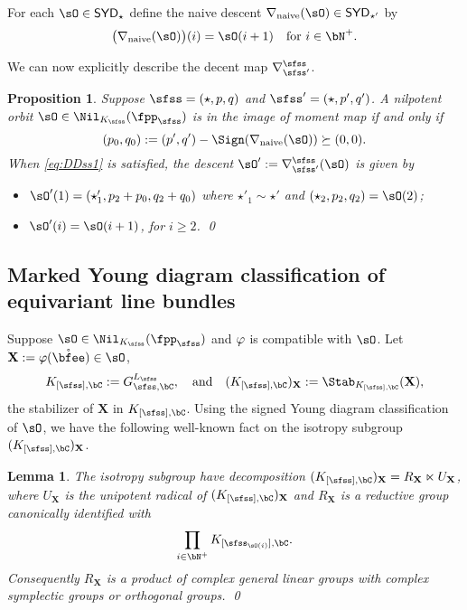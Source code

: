 \documentclass[12pt,a4paper]{amsart}
\def\SYD{{\mathsf{SYD}}}
\def\Im{\operatorname{Im}}
\newcommand{\X}{\mathbf{X}}
\def\DD{\nabla}
\numberwithin{equation}{section}
\newtheorem{lem}[thm]{Lemma}
\newtheorem{prop}[thm]{Proposition}
\theoremstyle{remark}
\def\DDn{\DD_{\mathrm{naive}}}
\begin{document}
For each $\sO\in \SYD_\star$ define the naive descent $\DDn(\sO)\in
\SYD_{\star'}$ by
\[\big(\DDn(\sO)\big)(i) = \sO(i+1) \quad \text{for } i \in \bN^+.\]

We can now explicitly describe the decent map $\DDss$.
\begin{prop}\label{prop:DDss}
Suppose $\sfss=(\star,p,q)$ and
$\sfss'=(\star,p',q')$. A nilpotent orbit $\sO\in \Nil_{\Ks}(\fpps)$ is in the
image of moment map if and only if
\begin{equation}\label{eq:DDss1}
  (p_0,q_0):= (p',q') - \Sign(\DDn(\sO)) \succeq (0,0).
\end{equation}
When \eqref{eq:DDss1} is satisfied, the descent $\sO' := \DDss(\sO)$
is given by
\begin{itemize}
\item $\sO'(1) = (\star'_1,p_2+p_0, q_2+q_0)$ where $\star'_1\sim \star'$ and
$(\star_{2},p_2,q_2)=\sO(2)$;
\item $\sO'(i) = \sO(i+1)$, for $i\geq 2$. \qed
\end{itemize}
\end{prop}

\subsection{Marked Young diagram classification of equivariant line bundles}
\label{sec:MYD}
\def\KCs{K_{[\sfss],\bC}}
\def\KCsX{(K_{[\sfss],\bC})_{\X}}
\def\KCsoX{(K_{[\sfss],\bC})_{\X}^{\circ}}
Suppose $\sO\in \Nil_{\Ks}(\fpps)$ and $\varphi$ is
compatible with $\sO$. Let  $\X := \SLT(\Xslt)\in \sO$,
\[
  \KCs := \GC^{L_{\sfss}}, \quad \text{and}\quad
  \KCsX:=\Stab_{\KC[[\sfss]]}(\X),
\]
the stabilizer of $\X$ in $\KCs$.
Using the signed Young diagram classification of $\sO$, we have the following
well-known fact on the isotropy subgroup $\KCsX$.

\begin{lem}\label{lem:KX1}
  The isotropy subgroup have decomposition $\KCsX= R_\X\ltimes U_\X$, where
  $U_\X$ is the unipotent radical of $\KCsX$ and $R_{\X}$ is a reductive group
  canonically identified with
  \[
    \prod_{i\in \bN^{+}} \KC[[\sfss_{\sO(i)}]].
  \]
 Consequently $R_{\X}$ is a product of complex general linear groups
with complex symplectic groups or orthogonal groups. \qed
\end{lem}


\end{document}
